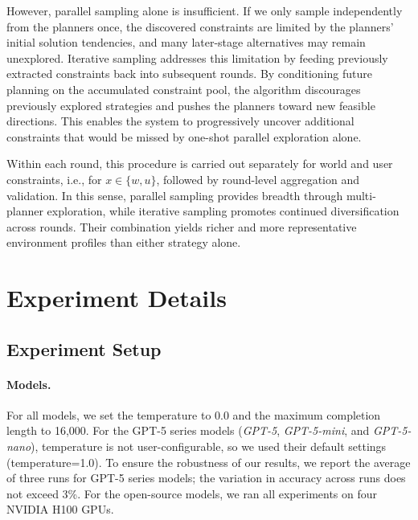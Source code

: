 However, parallel sampling alone is insufficient. 
If we only sample independently from the planners once, the discovered constraints are limited by the planners' initial solution tendencies, and many later-stage alternatives may remain unexplored. 
Iterative sampling addresses this limitation by feeding previously extracted constraints back into subsequent rounds. 
By conditioning future planning on the accumulated constraint pool, the algorithm discourages previously explored strategies and pushes the planners toward new feasible directions. 
This enables the system to progressively uncover additional constraints that would be missed by one-shot parallel exploration alone.

Within each round, this procedure is carried out separately for world and user constraints, i.e., for $x\in\{w,u\}$, followed by round-level aggregation and validation. 
In this sense, parallel sampling provides breadth through multi-planner exploration, while iterative sampling promotes continued diversification across rounds. 
Their combination yields richer and more representative environment profiles than either strategy alone.











\section{Experiment Details}
\label{app:exp-details}

\subsection{Experiment Setup}
\label{app:model-setup}

\paragraph{Models.}
For all models, we set the temperature to 0.0 and the maximum completion length to 16{,}000. 
For the GPT-5 series models (\textit{GPT-5}, \textit{GPT-5-mini}, and \textit{GPT-5-nano}), temperature is not user-configurable, so we used their default settings (temperature=1.0). 
To ensure the robustness of our results, we report the average of three runs for GPT-5 series models; the variation in accuracy across runs does not exceed 3\%.
For the open-source models, we ran all experiments on four NVIDIA H100 GPUs.

